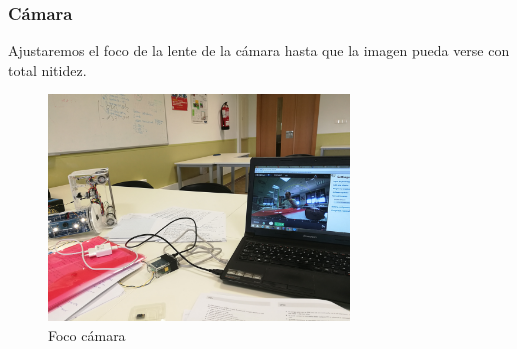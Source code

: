   \subsubsection{Cámara}
  \label{subsubsec:camara}
Ajustaremos el foco de la lente de la cámara hasta que la imagen pueda verse con total nitidez.
\begin{figure} [hbtp]
\begin{center}
  \includegraphics[width=8cm]{img/cap3/3_4/foco}
\end{center}
\caption{Foco cámara}
\label{fig:foco}
\end{figure}
    
